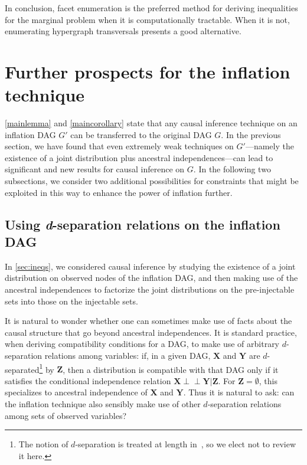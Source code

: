 \documentclass[aps,english,superscriptaddress,onecolumn,twoside,longbibliography,pra,floatfix,fleqn,nofootinbib]{revtex4-1}%
\theoremstyle{definition}
\newcommand{\indep}{\perp\!\!\!\!\perp} %
\begin{document}
In conclusion, facet enumeration is the preferred method for deriving inequalities for the marginal problem when it is computationally tractable.  When it is not, enumerating hypergraph transversals presents a good alternative.


\section{Further prospects for the inflation technique}\label{sec:otherprospects}

\cref{mainlemma} and \cref{maincorollary} state that any causal inference technique on an inflation DAG $G'$ can be transferred to the original DAG $G$. In the previous section, we have found that even extremely weak techniques on $G'$---namely the existence of a joint distribution plus ancestral independences---can lead to significant and new results for causal inference on $G$. In the following two subsections, we consider two additional possibilities for constraints that might be exploited in this way to enhance the power of inflation further.

\subsection{Using \textit{d}-separation relations on the inflation DAG}\label{sec:fulldsep}

In \cref{sec:ineqs}, we considered causal inference by studying the existence of a joint distribution on observed nodes of the inflation DAG, and then making use of the ancestral independences to factorize the joint distributions on the pre-injectable sets into those on the injectable sets.

It is natural to wonder whether one can sometimes make use of facts about the causal structure that go beyond ancestral independences.  It is standard practice, when deriving compatibility conditions for a DAG, to make use of arbitrary $d$-separation relations among variables: if, in a given DAG, $\bm{X}$ and $\bm{Y}$ are $d$-separated\footnote{The notion of $d$-separation is treated at length in~\cite{pearl2009causality,studeny2005probabilistic,WoodSpekkens,pusey2014gdag}, so we elect not to review it here.} by $\bm{Z}$, then a distribution is compatible with that DAG only if it satisfies the conditional independence relation $\bm{X}\indep\bm{Y}|\bm{Z}$. For $\bm{Z} = \emptyset$, this specializes to ancestral independence of $\bm{X}$ and $\bm{Y}$. Thus it is natural to ask: can the inflation technique also sensibly make use of other $d$-separation relations among sets of observed variables?
\end{document}
